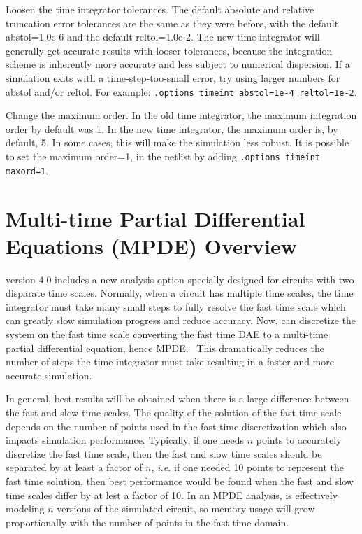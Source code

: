 \begin{XyceItemize}
  \item Loosen the time integrator tolerances.  The default absolute and relative truncation error tolerances are the same as they were before, with the default abstol=1.0e-6 and the default reltol=1.0e-2.  The new time integrator will generally get accurate results with looser tolerances, because the integration scheme is inherently more accurate and less subject to numerical dispersion.  If a simulation exits with a time-step-too-small error, try using larger numbers for abstol and/or reltol.  For example:  \texttt{.options timeint abstol=1e-4 reltol=1e-2}.
  \item Change the maximum order.  In the old time integrator, the maximum integration order by default was 1.  In the new time integrator, the maximum order is, by default, 5.  In some cases, this will make the simulation less robust. It is possible to set the maximum order=1, in the netlist by adding \texttt{.options timeint maxord=1}.
\end{XyceItemize}


\section{Multi-time Partial Differential Equations (MPDE) Overview}
\label{MPDE_Overview}

\Xyce{} version 4.0 includes a new analysis option specially designed
for circuits with two disparate time scales.  Normally, when a circuit
has multiple time scales, the time integrator must take many small steps
to fully resolve the fast time scale which can greatly slow simulation
progress and reduce accuracy.  Now, \Xyce{} can discretize the system on
the fast time scale converting the fast time DAE to a multi-time partial
differential equation, hence MPDE.~\cite{meiMpdeDAC2004}  This dramatically
reduces the number of steps the time integrator must take resulting in a faster
and more accurate simulation.  

In general, best results will be obtained when there is a large
difference between the fast and slow time scales.  The quality of the
solution of the fast time scale depends on the number of points used
in the fast time discretization which also impacts simulation
performance. Typically, if one needs $n$ points to accurately discretize
the fast time scale, then the fast and slow time scales should be
separated by at least a factor of $n$, {\em i.e.} if one needed 10
points to represent the fast time solution, then best performance would
be found when the fast and slow time scales differ by at lest a factor
of 10.  In an MPDE analysis, \Xyce{} is effectively modeling $n$ versions of 
the simulated circuit, so memory usage will grow proportionally with the number 
of points in the fast time domain.

